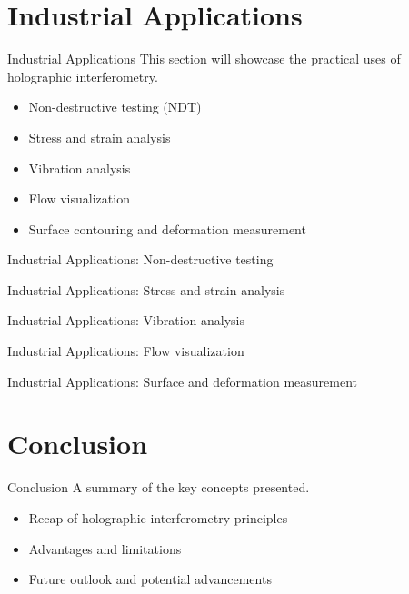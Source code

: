 \documentclass{beamer}
\begin{document}
\section{Industrial Applications}
\begin{frame}{Industrial Applications}
    This section will showcase the practical uses of holographic interferometry.
    \begin{itemize}
        \item Non-destructive testing (NDT)
        \item Stress and strain analysis
        \item Vibration analysis
        \item Flow visualization
        \item Surface contouring and deformation measurement
    \end{itemize}
\end{frame}
\begin{frame}{Industrial Applications: Non-destructive testing}

\end{frame}
\begin{frame}{Industrial Applications: Stress and strain analysis}

\end{frame}
\begin{frame}{Industrial Applications: Vibration analysis}

\end{frame}
\begin{frame}{Industrial Applications: Flow visualization}

\end{frame}
\begin{frame}{Industrial Applications: Surface and deformation measurement}

\end{frame}

\section{Conclusion}
\begin{frame}{Conclusion}
    A summary of the key concepts presented.
    \begin{itemize}
        \item Recap of holographic interferometry principles
        \item Advantages and limitations
        \item Future outlook and potential advancements
    \end{itemize}
\end{frame}

%   
\end{document}

